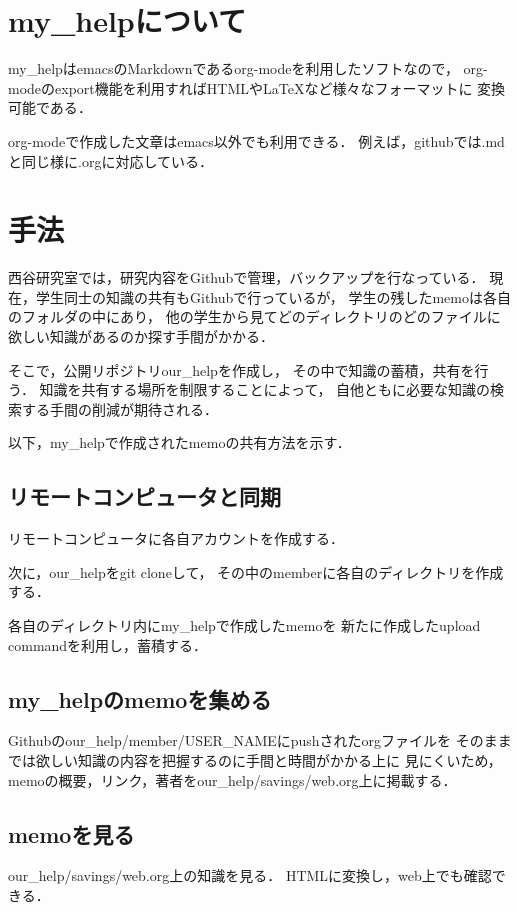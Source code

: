 \documentclass[a4j,twocolumn,uplatex]{jsarticle}
\begin{document}
\section{my\_helpについて}
my\_helpはemacsのMarkdownであるorg-modeを利用したソフトなので，
org-modeのexport機能を利用すればHTMLやLaTeXなど様々なフォーマットに
変換可能である\cite{org-mode}．

org-modeで作成した文章はemacs以外でも利用できる．
例えば，githubでは.mdと同じ様に.orgに対応している．

\section{手法}
西谷研究室では，研究内容をGithubで管理，バックアップを行なっている．
現在，学生同士の知識の共有もGithubで行っているが，
学生の残したmemoは各自のフォルダの中にあり，
他の学生から見てどのディレクトリのどのファイルに
欲しい知識があるのか探す手間がかかる．

そこで，公開リポジトリour\_helpを作成し，
その中で知識の蓄積，共有を行う．
知識を共有する場所を制限することによって，
自他ともに必要な知識の検索する手間の削減が期待される．

以下，my\_helpで作成されたmemoの共有方法を示す．
\subsection{リモートコンピュータと同期}
\label{sec-2-1}
リモートコンピュータに各自アカウントを作成する．

次に，our\_helpをgit cloneして，
その中のmemberに各自のディレクトリを作成する．

各自のディレクトリ内にmy\_helpで作成したmemoを
新たに作成したupload commandを利用し，蓄積する．

\subsection{my\_helpのmemoを集める}
\label{sec-2-2}
Githubのour\_help/member/USER\_NAMEにpushされたorgファイルを
そのままでは欲しい知識の内容を把握するのに手間と時間がかかる上に
見にくいため，
memoの概要，リンク，著者をour\_help/savings/web.org上に掲載する．


\subsection{memoを見る}
\label{sec-2-3}
our\_help/savings/web.org上の知識を見る．
HTMLに変換し，web上でも確認できる．
\end{document}
